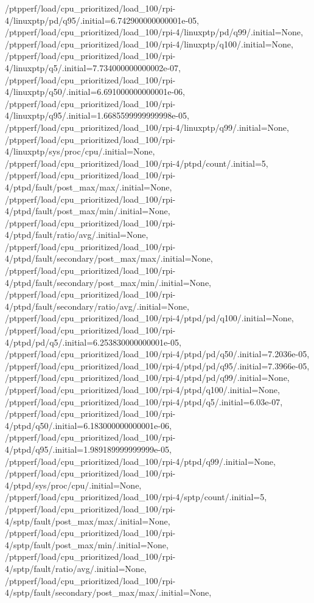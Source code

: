 {    /ptpperf/load/cpu_prioritized/load_100/rpi-4/linuxptp/pd/q95/.initial=6.742900000000001e-05,
    /ptpperf/load/cpu_prioritized/load_100/rpi-4/linuxptp/pd/q99/.initial=None,
    /ptpperf/load/cpu_prioritized/load_100/rpi-4/linuxptp/q100/.initial=None,
    /ptpperf/load/cpu_prioritized/load_100/rpi-4/linuxptp/q5/.initial=7.734000000000002e-07,
    /ptpperf/load/cpu_prioritized/load_100/rpi-4/linuxptp/q50/.initial=6.691000000000001e-06,
    /ptpperf/load/cpu_prioritized/load_100/rpi-4/linuxptp/q95/.initial=1.6685599999999998e-05,
    /ptpperf/load/cpu_prioritized/load_100/rpi-4/linuxptp/q99/.initial=None,
    /ptpperf/load/cpu_prioritized/load_100/rpi-4/linuxptp/sys/proc/cpu/.initial=None,
    /ptpperf/load/cpu_prioritized/load_100/rpi-4/ptpd/count/.initial=5,
    /ptpperf/load/cpu_prioritized/load_100/rpi-4/ptpd/fault/post_max/max/.initial=None,
    /ptpperf/load/cpu_prioritized/load_100/rpi-4/ptpd/fault/post_max/min/.initial=None,
    /ptpperf/load/cpu_prioritized/load_100/rpi-4/ptpd/fault/ratio/avg/.initial=None,
    /ptpperf/load/cpu_prioritized/load_100/rpi-4/ptpd/fault/secondary/post_max/max/.initial=None,
    /ptpperf/load/cpu_prioritized/load_100/rpi-4/ptpd/fault/secondary/post_max/min/.initial=None,
    /ptpperf/load/cpu_prioritized/load_100/rpi-4/ptpd/fault/secondary/ratio/avg/.initial=None,
    /ptpperf/load/cpu_prioritized/load_100/rpi-4/ptpd/pd/q100/.initial=None,
    /ptpperf/load/cpu_prioritized/load_100/rpi-4/ptpd/pd/q5/.initial=6.253830000000001e-05,
    /ptpperf/load/cpu_prioritized/load_100/rpi-4/ptpd/pd/q50/.initial=7.2036e-05,
    /ptpperf/load/cpu_prioritized/load_100/rpi-4/ptpd/pd/q95/.initial=7.3966e-05,
    /ptpperf/load/cpu_prioritized/load_100/rpi-4/ptpd/pd/q99/.initial=None,
    /ptpperf/load/cpu_prioritized/load_100/rpi-4/ptpd/q100/.initial=None,
    /ptpperf/load/cpu_prioritized/load_100/rpi-4/ptpd/q5/.initial=6.03e-07,
    /ptpperf/load/cpu_prioritized/load_100/rpi-4/ptpd/q50/.initial=6.183000000000001e-06,
    /ptpperf/load/cpu_prioritized/load_100/rpi-4/ptpd/q95/.initial=1.989189999999999e-05,
    /ptpperf/load/cpu_prioritized/load_100/rpi-4/ptpd/q99/.initial=None,
    /ptpperf/load/cpu_prioritized/load_100/rpi-4/ptpd/sys/proc/cpu/.initial=None,
    /ptpperf/load/cpu_prioritized/load_100/rpi-4/sptp/count/.initial=5,
    /ptpperf/load/cpu_prioritized/load_100/rpi-4/sptp/fault/post_max/max/.initial=None,
    /ptpperf/load/cpu_prioritized/load_100/rpi-4/sptp/fault/post_max/min/.initial=None,
    /ptpperf/load/cpu_prioritized/load_100/rpi-4/sptp/fault/ratio/avg/.initial=None,
    /ptpperf/load/cpu_prioritized/load_100/rpi-4/sptp/fault/secondary/post_max/max/.initial=None,
}
